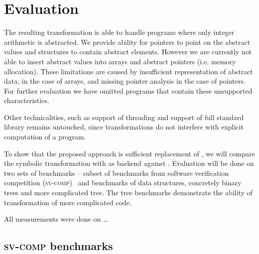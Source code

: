 \chapter{Evaluation}\label{ch:results}

The resulting transformation is able to handle programs where only integer
arithmetic is abstracted. We provide ability for pointers to point on the
abstract values and structures to contain abstract elements. However we are
currently not able to insert abstract values into arrays and abstract pointers
(i.e. memory allocation). These limitations are caused by insufficient
representation of abstract data, in the case of arrays,
and missing pointer analysis in the case of pointers. For further evaluation we
have omitted programs that contain these unsupported characteristics.

Other technicalities, such as support of threading and support of full \Cpp{}
standard library remains untouched, since transformations do not interfere with
explicit computation of a program.

To show that the proposed approach is sufficient replacement of \SymDIVINE, we
will compare the symbolic transformation with \DIVINE as backend against \SymDIVINE.
Evaluation will be done on two sets of benchmarks -- subset of benchmarks from
software verification competition (\textsc{sv-comp})~\cite{Beyer17} and
benchmarks of data structures, concretely binary trees and more complicated \AVL
tree. The \AVL tree benchmarks demonstrate the ability of transformation of more
complicated code.

All measurements were done on \dots
{}

\section{\textsc{sv-comp} benchmarks}

